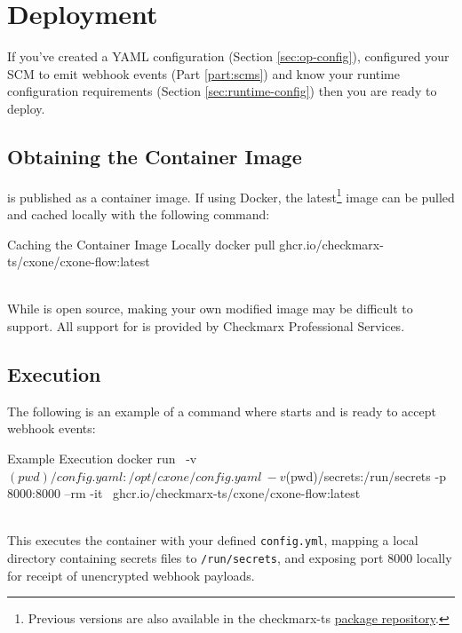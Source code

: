 \chapter{Deployment}\label{sec:deployment}

If you've created a YAML configuration (Section \ref{sec:op-config}), configured your SCM to emit webhook events
(Part \ref{part:scms}) and know your runtime configuration requirements (Section \ref{sec:runtime-config}) then
you are ready to deploy.

\section{Obtaining the Container Image}

\cxoneflow is published as a container image.  If using Docker, the
latest\footnote{Previous versions are also available in the
checkmarx-ts \href{https://github.com/checkmarx-ts/cxone-flow/pkgs/container/cxone\%2Fcxone-flow}{package repository}.} image can be pulled and cached locally
with the following command:

\begin{code}{Caching the \cxoneflow Container Image Locally}{}{}
docker pull ghcr.io/checkmarx-ts/cxone/cxone-flow:latest
\end{code}

\noindent\\While \cxoneflow is open source, making your own modified image may be difficult to support.  All
support for \cxoneflow is provided by Checkmarx Professional Services.

\section{\cxoneflow Execution}

The following is an example of a command where \cxoneflow starts and is ready to accept webhook events:

\begin{code}{\cxoneflow Example Execution}{}{}
docker run \
    -v $(pwd)/config.yaml:/opt/cxone/config.yaml \
    -v $(pwd)/secrets:/run/secrets -p 8000:8000 --rm -it \ 
    ghcr.io/checkmarx-ts/cxone/cxone-flow:latest
\end{code}

\noindent\\This executes the container with your defined \texttt{config.yml}, mapping a local directory
containing secrets files to \texttt{/run/secrets}, and exposing port 8000 locally for receipt of 
unencrypted webhook payloads.




